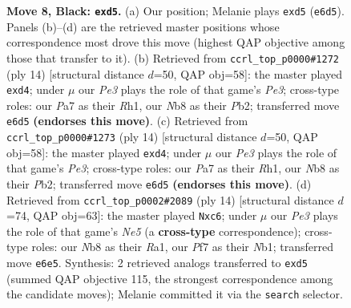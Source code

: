 \documentclass[11pt]{article}
\begin{document}
\begin{figure}[p]
\caption{\textbf{Move 8, Black: \texttt{exd5}.} (a) Our position; Melanie plays \texttt{exd5} (\texttt{e6d5}). Panels (b)--(d) are the retrieved master positions whose correspondence most drove this move (highest QAP objective among those that transfer to it). (b) Retrieved from \texttt{ccrl\_top\_p0000\#1272} (ply 14) [structural distance $d$=50, QAP obj=58]: the master played \texttt{exd4}; under $\mu$ our \emph{Pe3} plays the role of that game's \emph{Pe3}; cross-type roles: our \emph{P}a7 as their \emph{R}h1, our \emph{N}b8 as their \emph{P}b2; transferred move \texttt{e6d5} \textbf{(endorses this move)}. (c) Retrieved from \texttt{ccrl\_top\_p0000\#1273} (ply 14) [structural distance $d$=50, QAP obj=58]: the master played \texttt{exd4}; under $\mu$ our \emph{Pe3} plays the role of that game's \emph{Pe3}; cross-type roles: our \emph{P}a7 as their \emph{R}h1, our \emph{N}b8 as their \emph{P}b2; transferred move \texttt{e6d5} \textbf{(endorses this move)}. (d) Retrieved from \texttt{ccrl\_top\_p0002\#2089} (ply 14) [structural distance $d$=74, QAP obj=63]: the master played \texttt{Nxc6}; under $\mu$ our \emph{Pe3} plays the role of that game's \emph{Ne5} (a \textbf{cross-type} correspondence); cross-type roles: our \emph{N}b8 as their \emph{R}a1, our \emph{P}f7 as their \emph{N}b1; transferred move \texttt{e6e5}. Synthesis: 2 retrieved analogs transferred to \texttt{exd5} (summed QAP objective 115, the strongest correspondence among the candidate moves); Melanie committed it via the \texttt{search} selector.}
\label{fig:thought-m15}
\end{figure}

\clearpage
\end{document}
